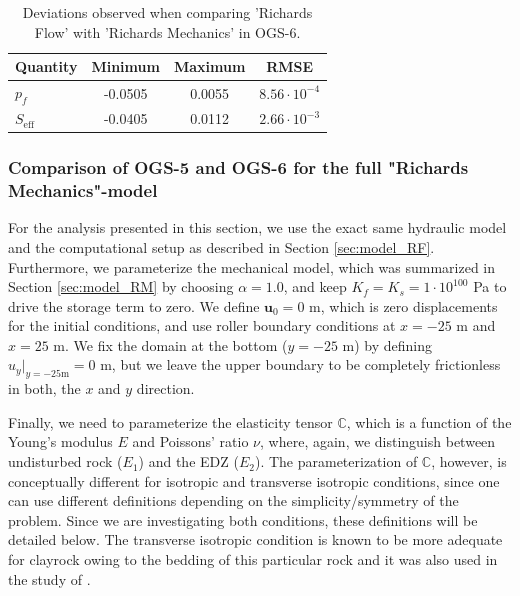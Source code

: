 \begin{table}
 \caption{Deviations observed when comparing 'Richards Flow' with 'Richards Mechanics' in OGS-6.\label{tab:richards_mechanics}}
\begin{center}
\begin{tabular}{ l | c | c | c }
 Quantity			& Minimum 	& Maximum	 & RMSE  \\
 \hline
 $p_f$ & -0.0505 	& 0.0055	& $8.56\cdot 10^{-4}$\\ 
 $S_\text{eff}$	 	& -0.0405 & 0.0112	& $2.66\cdot 10^{-3}$\\		
\end{tabular}
\end{center}
\end{table}


\subsubsection{Comparison of OGS-5 and OGS-6 for the full "Richards Mechanics"-model}\label{sec:full_RM}
For the analysis presented in this section, we use the exact same hydraulic model and the computational setup as described in Section \ref{sec:model_RF}. Furthermore, we parameterize the mechanical model, which was summarized in Section \ref{sec:model_RM} by choosing $\alpha=1.0$, and keep $K_f=K_s=1\cdot 10^{100}$ Pa to drive the storage term to zero. We define $\textbf{u}_0=0$ m, which is zero displacements for the initial conditions, and use roller boundary conditions at $x=-25$ m and $x=25$ m. We fix the domain at the bottom ($y=-25$ m) by defining $u_y\rvert_{y=-25\text{m}}=0$ m, but we leave the upper boundary to be completely frictionless in both, the $x$ and $y$ direction.

Finally, we need to parameterize the elasticity tensor $\mathds{C}$, which is a function of the Young's modulus $E$ and Poissons' ratio $\nu$, where, again, we distinguish between undisturbed rock ($E_1$) and the EDZ ($E_2$). The parameterization of $\mathds{C}$, however, is conceptually different for isotropic and transverse isotropic conditions, since one can use different definitions depending on the simplicity/symmetry of the problem. Since we are investigating both conditions, these definitions will be detailed below. The transverse isotropic condition is known to be more adequate for clayrock owing to the bedding of this particular rock and it was also used in the study of \cite{ziefle2018}.

